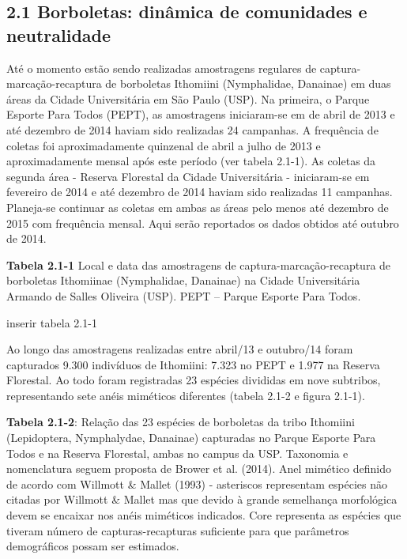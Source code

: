 \subsection{2.1 Borboletas: dinâmica de comunidades e neutralidade} %
\label{sec:dinamica-temporal-borb} 
Até o momento estão sendo realizadas amostragens regulares de captura-marcação-recaptura de borboletas Ithomiini (Nymphalidae, Danainae) em duas áreas da Cidade Universitária em São Paulo (USP). Na primeira, o Parque Esporte Para Todos (PEPT), as amostragens iniciaram-se em de abril de 2013 e até dezembro de 2014 haviam sido realizadas 24 campanhas. A frequência de coletas foi aproximadamente quinzenal de abril a julho de 2013 e aproximadamente mensal após este período (ver tabela 2.1-1). As coletas da segunda área - Reserva Florestal da Cidade Universitária - iniciaram-se em fevereiro de 2014 e até dezembro de 2014 haviam sido realizadas 11 campanhas. Planeja-se continuar as coletas em ambas as áreas pelo menos até dezembro de 2015 com frequência mensal. Aqui serão reportados os dados obtidos até outubro de 2014.

\textbf{Tabela 2.1-1} Local e data das amostragens de captura-marcação-recaptura de borboletas Ithomiinae (Nymphalidae, Danainae) na Cidade Universitária Armando de Salles Oliveira (USP). PEPT – Parque Esporte Para Todos.

inserir tabela 2.1-1



Ao longo das amostragens realizadas entre abril/13 e outubro/14 foram capturados 9.300 indivíduos de Ithomiini: 7.323 no PEPT e 1.977 na Reserva Florestal. Ao todo foram registradas 23 espécies divididas em nove subtribos, representando sete anéis miméticos diferentes (tabela 2.1-2 e figura 2.1-1). 

\textbf{Tabela 2.1-2}: Relação das 23 espécies de borboletas da tribo Ithomiini (Lepidoptera, Nymphalydae, Danainae) capturadas no Parque Esporte Para Todos e na Reserva Florestal, ambas no campus da USP. Taxonomia e nomenclatura seguem proposta de Brower et al. (2014). Anel mimético definido de acordo com Willmott & Mallet (1993) - asteriscos representam espécies não citadas por Willmott & Mallet mas que devido à grande semelhança morfológica devem se encaixar nos anéis miméticos indicados. Core representa as espécies que tiveram número de capturas-recapturas suficiente para que parâmetros demográficos possam ser estimados.